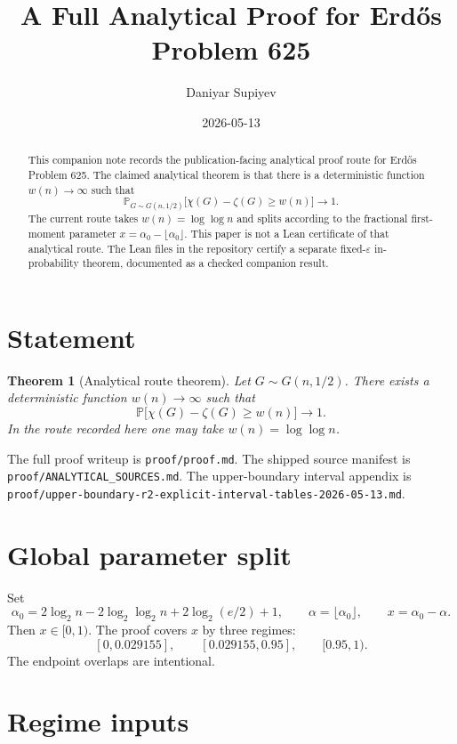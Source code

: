 \documentclass[11pt,a4paper]{article}
\title{A Full Analytical Proof for Erd\H{o}s Problem 625}
\author{Daniyar Supiyev}
\date{2026-05-13}
\newtheorem{theorem}{Theorem}
\newcommand{\Gnh}{G(n,1/2)}
\newcommand{\chrom}{\chi}
\newcommand{\cochrom}{\zeta}
\renewcommand{\Pr}{\mathbb{P}}
\begin{document}
\maketitle

\begin{abstract}
This companion note records the publication-facing analytical proof route
for Erd\H{o}s Problem 625.  The claimed analytical theorem is that there is
a deterministic function $w(n)\to\infty$ such that
\[
  \Pr_{G\sim \Gnh}\bigl[\chrom(G)-\cochrom(G)\ge w(n)\bigr]\to 1.
\]
The current route takes $w(n)=\log\log n$ and splits according to the
fractional first-moment parameter $x=\alpha_0-\lfloor\alpha_0\rfloor$.
This paper is not a Lean certificate of that analytical route.  The Lean
files in the repository certify a separate fixed-$\varepsilon$
in-probability theorem, documented as a checked companion result.
\end{abstract}

\section{Statement}

\begin{theorem}[Analytical route theorem]\label{thm:analytical}
Let $G\sim\Gnh$.  There exists a deterministic function $w(n)\to\infty$
such that
\[
  \Pr\bigl[\chrom(G)-\cochrom(G)\ge w(n)\bigr]\to 1.
\]
In the route recorded here one may take $w(n)=\log\log n$.
\end{theorem}

The full proof writeup is \texttt{proof/proof.md}.  The shipped source
manifest is \texttt{proof/ANALYTICAL\_SOURCES.md}.  The upper-boundary
interval appendix is
\texttt{proof/upper-boundary-r2-explicit-interval-tables-2026-05-13.md}.

\section{Global parameter split}

Set
\[
\alpha_0=2\log_2 n-2\log_2\log_2 n+2\log_2(e/2)+1,
\qquad \alpha=\lfloor\alpha_0\rfloor,
\qquad x=\alpha_0-\alpha.
\]
Then $x\in[0,1)$.  The proof covers $x$ by three regimes:
\[
[0,0.029155],\qquad [0.029155,0.95],\qquad [0.95,1).
\]
The endpoint overlaps are intentional.

\section{Regime inputs}
\end{document}
